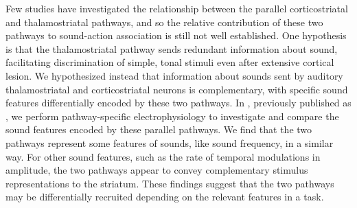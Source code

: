 Few studies have investigated the relationship between the parallel corticostriatal and thalamostriatal pathways, and so the relative contribution of these two pathways to sound-action association is still not well established.
One hypothesis is that the thalamostriatal pathway sends redundant information about sound, facilitating discrimination of simple, tonal stimuli even after extensive cortical lesion.
We hypothesized instead that information about sounds sent by auditory thalamostriatal and corticostriatal neurons is complementary, with specific sound features differentially encoded by these two pathways.
In \ch{\Thstr}, previously published as \citet{Ponvert2019}, we perform pathway-specific electrophysiology to investigate and compare the sound features encoded by these parallel pathways.
%
We find that the two pathways represent some features of sounds, like sound frequency, in a similar way.
%
For other sound features, such as the rate of temporal modulations in amplitude, the two pathways appear to convey complementary stimulus representations to the striatum.
%
These findings suggest that the two pathways may be differentially recruited depending on the relevant features in a task. 

